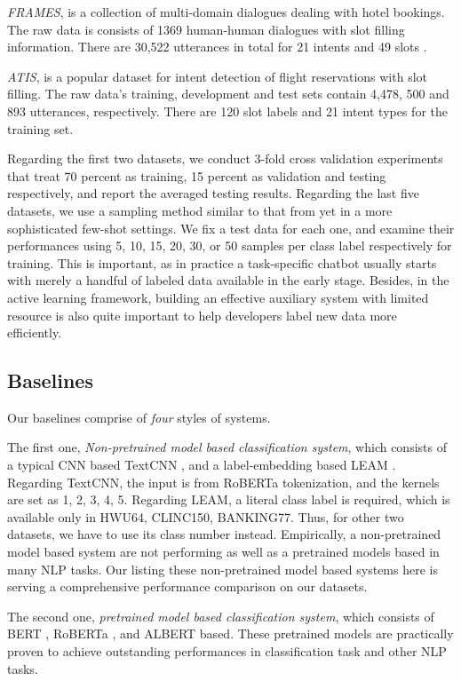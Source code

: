 \emph{FRAMES}, is a collection of multi-domain dialogues dealing with
hotel bookings. The raw data is consists of 1369 human-human
dialogues with slot filling information. There are 30,522 utterances in total for 21 intents and 49 slots \cite{asri2017frames}.

\emph{ATIS}, is a popular dataset for intent detection of flight reservations with slot filling\cite{tur2010left}. The raw data's training, development and test sets contain 4,478, 500 and 893 utterances, respectively. There are 120 slot labels and 21 intent types for the training set.

Regarding the first two datasets, we conduct 3-fold cross validation experiments that treat 70 percent as training, 15 percent as validation and testing respectively, and report the averaged testing results. 
Regarding the last five datasets, we use a sampling method similar to that from \cite{casanueva2020efficient} yet in a more sophisticated few-shot settings. 
We fix a test data for each one, and examine their performances using 5, 10, 15, 20, 30, or 50 samples per class label respectively for training. 
This is important, as in practice a task-specific chatbot usually starts with merely a handful of labeled data available in the early stage.
Besides, in the active learning framework, building an effective auxiliary system with limited resource is also quite important to help developers label new data more efficiently.

\subsection{Baselines}
Our baselines comprise of \emph{four} styles of systems. 

The first one, \emph{Non-pretrained model based classification system}, which consists of a typical CNN based TextCNN \cite{kim2014convolutional}, and a label-embedding based LEAM \cite{wang2018joint}. 
Regarding TextCNN, the input is from RoBERTa tokenization, and the kernels are set as 1, 2, 3, 4, 5. 
Regarding LEAM, a literal class label is required, which is available only in HWU64, CLINC150, BANKING77. 
Thus, for other two datasets, we have to use its class number instead. 
Empirically, a non-pretrained model based system are not performing as well as a pretrained models based in many NLP tasks.
Our listing these non-pretrained model based systems here is serving a comprehensive performance comparison on our datasets.

The second one, \emph{pretrained model based classification system}, which consists of BERT \cite{devlin2018bert}, RoBERTa \cite{liu2019roberta}, and ALBERT \cite{lan2019albert} based. 
These pretrained models are practically proven to achieve outstanding performances in classification task and other NLP tasks.

